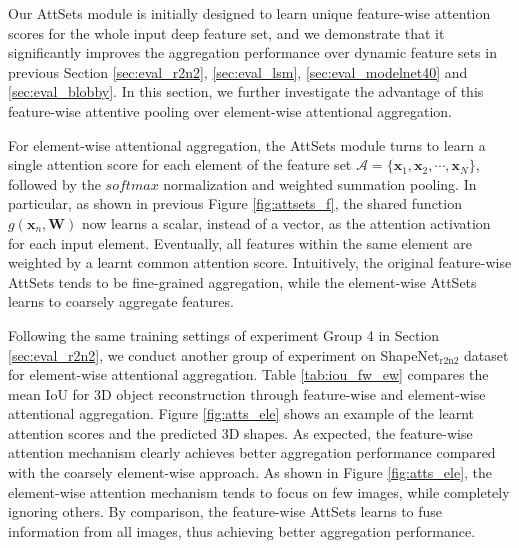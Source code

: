 \documentclass[twocolumn]{svjour3}    \pdfoutput=1
\newcommand{\nickname}{AttSets}
\begin{document}
Our \nickname{} module is initially designed to learn unique feature-wise attention scores for the whole input deep feature set, and we demonstrate that it significantly improves the aggregation performance over dynamic feature sets in previous Section \ref{sec:eval_r2n2}, \ref{sec:eval_lsm}, \ref{sec:eval_modelnet40} and \ref{sec:eval_blobby}. In this section, we further investigate the advantage of this feature-wise attentive pooling over element-wise attentional aggregation.

For element-wise attentional aggregation, the \nickname{} module turns to learn a single attention score for each element of the feature set $\mathcal{A} = \{\boldsymbol{x}_1, \boldsymbol{x}_2, \cdots, \boldsymbol{x}_N\}$, followed by the $softmax$ normalization and weighted summation pooling. In particular, as shown in previous Figure \ref{fig:attsets_f}, the shared function $g(\boldsymbol{x}_n, \boldsymbol{W})$ now learns a scalar, instead of a vector, as the attention activation for each input element. Eventually, all features within the same element are weighted by a learnt common attention score. Intuitively, the original feature-wise \nickname{} tends to be fine-grained aggregation, while the element-wise \nickname{} learns to coarsely aggregate features.

Following the same training settings of experiment Group 4 in Section \ref{sec:eval_r2n2}, we conduct another group of experiment on ShapeNet$_{\textrm{r2n2}}$ dataset for element-wise attentional aggregation. Table \ref{tab:iou_fw_ew} compares the mean IoU for 3D object reconstruction through feature-wise and element-wise attentional aggregation. Figure \ref{fig:atts_ele} shows an example of the learnt attention scores and the predicted 3D shapes. As expected, the feature-wise attention mechanism clearly achieves better aggregation performance compared with the coarsely element-wise approach. As shown in Figure \ref{fig:atts_ele}, the element-wise attention mechanism tends to focus on few images, while completely ignoring others. By comparison, the feature-wise \nickname{} learns to fuse information from all images, thus achieving better aggregation performance.

\vspace{-0.3cm}
\end{document}
